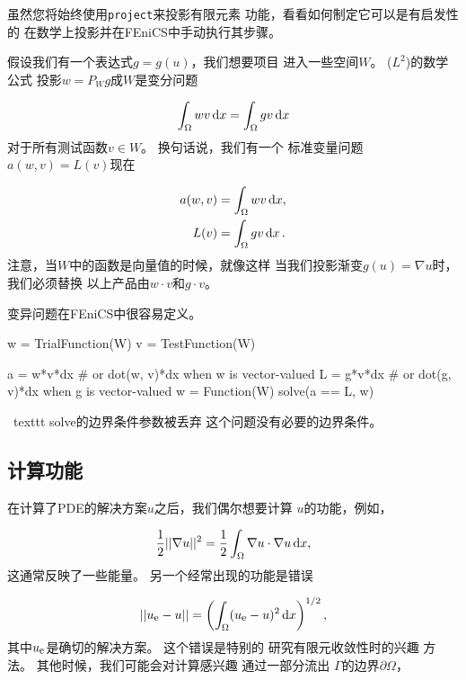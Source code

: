 \begin{notice}[手动投影。]
虽然您将始终使用\texttt{project}来投影有限元素
功能，看看如何制定它可以是有启发性的
在数学上投影并在FEniCS中手动执行其步骤。

假设我们有一个表达式$g = g(u)$，我们想要项目
进入一些空间$W$。 ($L^2$)的数学公式
投影$w = P_W g$成$W$是变分问题

\begin{equation}
  \int_{\Omega} w v \dx = \int_{\Omega} g v \dx
\end{equation}
对于所有测试函数$v\in W$。 换句话说，我们有一个
标准变量问题$a(w, v) = L(v)$现在

\begin{align}
a(w, v) &= \int_\Omega w v \dx,\\
L(v) &= \int_\Omega g v \dx\tp
\end{align}
注意，当$W$中的函数是向量值的时候，就像这样
当我们投影渐变$g(u) = \nabla u$时，我们必须替换
以上产品由$w\cdot v$和$g\cdot v$。

变异问题在FEniCS中很容易定义。
\begin{python}
w = TrialFunction(W)
v = TestFunction(W)

a = w*v*dx  # or dot(w, v)*dx when w is vector-valued
L = g*v*dx  # or dot(g, v)*dx when g is vector-valued
w = Function(W)
solve(a == L, w)
\end{python}
\ texttt {solve}的边界条件参数被丢弃
这个问题没有必要的边界条件。
\end{notice}

\subsection{计算功能}
\label{ch:poisson0:functionals}

在计算了PDE的解决方案$u$之后，我们偶尔想要计算
$u$的功能，例如，

\begin{equation}
{1\over2}||\nabla u||^2 = {1\over2}\int_\Omega \nabla u\cdot \nabla u \dx,
\label{ch:poisson0:functionals:energy}
\end{equation}
这通常反映了一些能量。
另一个经常出现的功能是错误

\begin{equation}
||\uex-u|| = \left(\int_\Omega (\uex-u)^2 \dx\right)^{1/2},
\label{ch:poisson0:functionals:error}
\end{equation}
其中$\uex$是确切的解决方案。 这个错误是特别的
研究有限元收敛性时的兴趣
方法。 其他时候，我们可能会对计算感兴趣
通过一部分流出
$\Gamma$的边界$\partial\Omega$，

